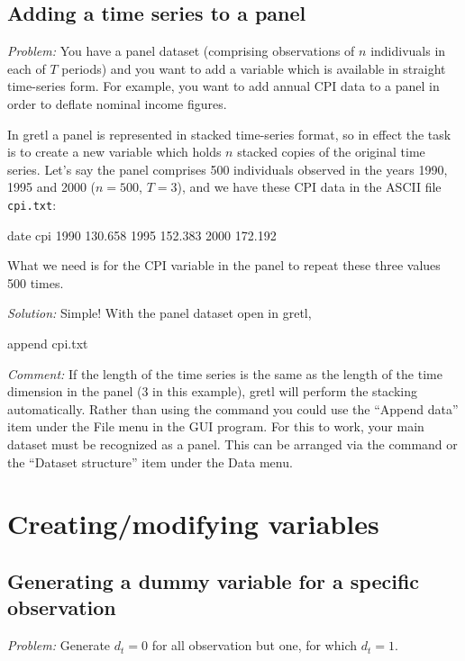 \subsection{Adding a time series to a panel}

\emph{Problem:} You have a panel dataset (comprising observations of
$n$ indidivuals in each of $T$ periods) and you want to add a variable
which is available in straight time-series form.  For example, you
want to add annual CPI data to a panel in order to deflate nominal
income figures.

In gretl a panel is represented in stacked time-series format, so in
effect the task is to create a new variable which holds $n$ stacked
copies of the original time series.  Let's say the panel comprises 500
individuals observed in the years 1990, 1995 and 2000 ($n=500$,
$T=3$), and we have these CPI data in the ASCII file \texttt{cpi.txt}:

\begin{code}
date cpi
1990 130.658
1995 152.383
2000 172.192
\end{code}

What we need is for the CPI variable in the panel to repeat these
three values 500 times.

\emph{Solution:} Simple!  With the panel dataset open in gretl,
\begin{code}
append cpi.txt
\end{code}

\emph{Comment:} If the length of the time series is the same as the
length of the time dimension in the panel (3 in this example), gretl
will perform the stacking automatically.  Rather than using the
 command you could use the ``Append data'' item under
the \textsf{File} menu in the GUI program.  For this to work, your
main dataset must be recognized as a panel.  This can be arranged via
the  command or the ``Dataset structure'' item under
the \textsf{Data} menu.


\section{Creating/modifying variables}

\subsection{Generating a dummy variable for a specific observation}

\emph{Problem:} Generate $d_t = 0$ for all observation but one, for
which $d_t = 1$.

